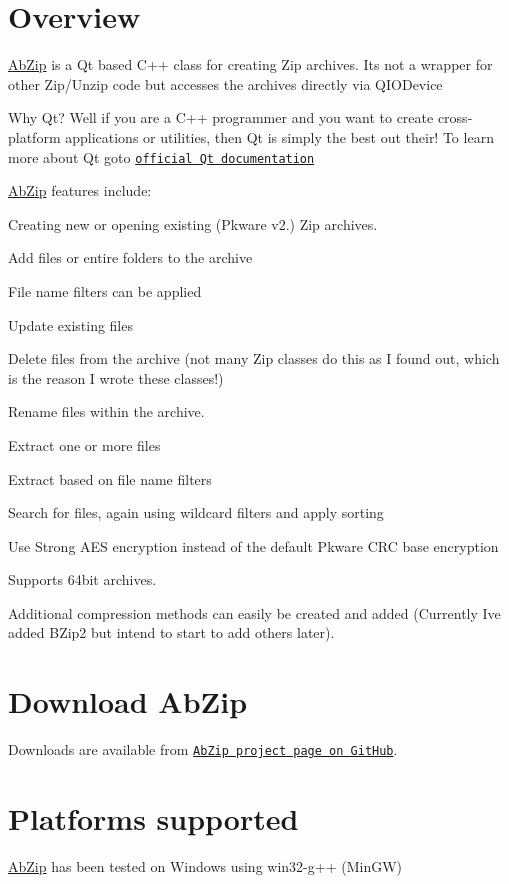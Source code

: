 \hypertarget{index_overview}{}\section{Overview}\label{index_overview}
\hyperlink{class_ab_zip}{Ab\+Zip} is a Qt based C++ class for creating Zip archives. It\textquotesingle{}s not a wrapper for other Zip/\+Unzip code but accesses the archives directly via Q\+I\+O\+Device

Why Qt? Well if you are a C++ programmer and you want to create cross-\/platform applications or utilities, then Qt is simply the best out their! To learn more about Qt goto \href{http://qt-project.org/doc/}{\tt official Qt documentation}

\hyperlink{class_ab_zip}{Ab\+Zip} features include\+:
\begin{DoxyItemize}
\item Creating new or opening existing (Pkware v2.) Zip archives.
\item Add files or entire folders to the archive
\item File name filters can be applied
\item Update existing files
\item Delete files from the archive (not many Zip classes do this as I found out, which is the reason I wrote these classes!)
\item Rename files within the archive.
\item Extract one or more files
\item Extract based on file name filters
\item Search for files, again using wildcard filters and apply sorting
\item Use Strong A\+ES encryption instead of the default Pkware C\+RC base encryption
\item Supports 64bit archives.
\item Additional compression methods can easily be created and added (Currently I\textquotesingle{}ve added B\+Zip2 but intend to start to add others later).
\end{DoxyItemize}\hypertarget{index_download}{}\section{Download Ab\+Zip}\label{index_download}
Downloads are available from \href{https://github.com/abelayer/AbZip}{\tt Ab\+Zip project page on Git\+Hub}.\hypertarget{index_platforms}{}\section{Platforms supported}\label{index_platforms}
\hyperlink{class_ab_zip}{Ab\+Zip} has been tested on Windows using win32-\/g++ (Min\+GW)

